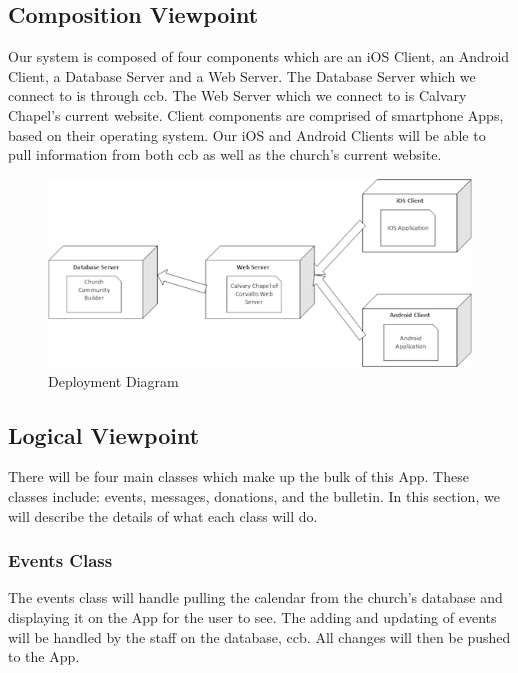 \documentclass[letterpaper,10pt,draftclsnofoot,onecolumn,titlepage]{IEEEtran}
\begin{document}
		\subsection{Composition Viewpoint}
			Our system is composed of four components which are an \gls{iOS} Client, an \gls{Android} Client, a Database Server and a Web Server.
			The Database Server which we connect to is through \gls{ccb}.
			The Web Server which we connect to is Calvary Chapel's current website.
			Client components are comprised of smartphone \glspl{App}, based on their operating system.
			Our \gls{iOS} and \gls{Android} Clients will be able to pull information from both \gls{ccb} as well as the church's current website.

		\begin{figure}[H]
			\centering
			\includegraphics[natwidth=552, natheight=245]{Deployment.png}
			\caption{Deployment Diagram}
			\label{fig:deployment}
		\end{figure}

		\subsection{Logical Viewpoint}
			There will be four main classes which make up the bulk of this \gls{App}.
			These classes include: events, messages, donations, and the bulletin.
			In this section, we will describe the details of what each class will do.

			\subsubsection{Events Class}
				The events class will handle pulling the calendar from the church's database and displaying it on the \gls{App} for the user to see.
				The adding and updating of events will be handled by the staff on the database, \gls{ccb}.
				All changes will then be pushed to the \gls{App}.
\end{document}
